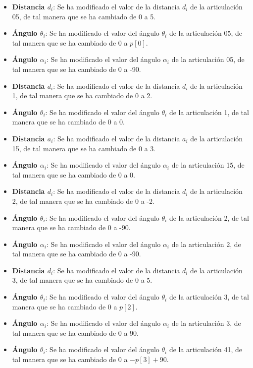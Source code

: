 \documentclass[11pt]{report}
\begin{document}
\begin{itemize}
    \item \textbf{Distancia $d_i$}: Se ha modificado el valor de la distancia $d_i$ de la articulación 05, de tal manera que se ha cambiado de 0 a 5.
    \item \textbf{Ángulo $\theta_i$}: Se ha modificado el valor del ángulo $\theta_i$ de la articulación 05, de tal manera que se ha cambiado de 0 a $p[0]$.
    \item \textbf{Ángulo $\alpha_i$}: Se ha modificado el valor del ángulo $\alpha_i$ de la articulación 05, de tal manera que se ha cambiado de 0 a -90.
    \item \textbf{Distancia $d_i$}: Se ha modificado el valor de la distancia $d_i$ de la articulación 1, de tal manera que se ha cambiado de 0 a 2.
    \item \textbf{Ángulo $\theta_i$}: Se ha modificado el valor del ángulo $\theta_i$ de la articulación 1, de tal manera que se ha cambiado de 0 a 0.
    \item \textbf{Distancia $a_i$}: Se ha modificado el valor de la distancia $a_i$ de la articulación 15, de tal manera que se ha cambiado de 0 a 3.
    \item \textbf{Ángulo $\alpha_i$}: Se ha modificado el valor del ángulo $\alpha_i$ de la articulación 15, de tal manera que se ha cambiado de 0 a 0.
    \item \textbf{Distancia $d_i$}: Se ha modificado el valor de la distancia $d_i$ de la articulación 2, de tal manera que se ha cambiado de 0 a -2.
    \item \textbf{Ángulo $\theta_i$}: Se ha modificado el valor del ángulo $\theta_i$ de la articulación 2, de tal manera que se ha cambiado de 0 a -90.
    \item \textbf{Ángulo $\alpha_i$}: Se ha modificado el valor del ángulo $\alpha_i$ de la articulación 2, de tal manera que se ha cambiado de 0 a -90.
    \item \textbf{Distancia $d_i$}: Se ha modificado el valor de la distancia $d_i$ de la articulación 3, de tal manera que se ha cambiado de 0 a 5.
    \item \textbf{Ángulo $\theta_i$}: Se ha modificado el valor del ángulo $\theta_i$ de la articulación 3, de tal manera que se ha cambiado de 0 a $p[2]$.
    \item \textbf{Ángulo $\alpha_i$}: Se ha modificado el valor del ángulo $\alpha_i$ de la articulación 3, de tal manera que se ha cambiado de 0 a 90.
    \item \textbf{Ángulo $\theta_i$}: Se ha modificado el valor del ángulo $\theta_i$ de la articulación 41, de tal manera que se ha cambiado de 0 a $-p[3] + 90$.

\end{itemize}
\end{document}
